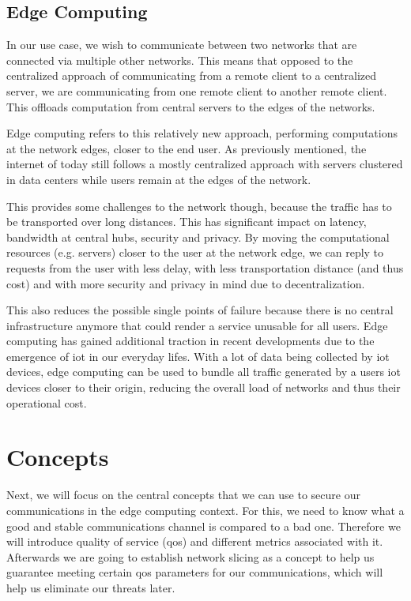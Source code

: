 \subsection{Edge Computing}
In our use case, we wish to communicate between two networks that are connected via multiple other networks. This means that opposed to the centralized approach of communicating from a remote client to a centralized server, we are communicating from one remote client to another remote client. This offloads computation from central servers to the edges of the networks.

Edge computing \cite{edgecomputing} refers to this relatively new approach, performing computations at the network edges, closer to the end user. As previously mentioned, the internet of today still follows a mostly centralized approach with servers clustered in data centers while users remain at the edges of the network.

This provides some challenges to the network though, because the traffic has to be transported over long distances. This has significant impact on \gls{latency}, \gls{bandwidth} at central hubs, security and privacy. By moving the computational resources (e.g. servers) closer to the user at the network edge, we can reply to requests from the user with less delay, with less transportation distance (and thus cost) and with more security and privacy in mind due to decentralization.

This also reduces the possible single points of failure because there is no central infrastructure anymore that could render a service unusable for all users. Edge computing has gained additional traction in recent developments due to the emergence of \acrshort{iot} in our everyday lifes. With a lot of data being collected by \acrshort{iot} devices, edge computing can be used to bundle all traffic generated by a users \acrshort{iot} devices closer to their origin, reducing the overall load of networks and thus their operational cost.


\section{Concepts}
\label{bg_concepts}
Next, we will focus on the central concepts that we can use to secure our communications in the edge computing context. For this, we need to know what a good and stable communications channel is compared to a bad one. Therefore we will introduce quality of service (\acrshort{qos}) and different metrics associated with it. Afterwards we are going to establish network slicing as a concept to help us guarantee meeting certain \acrshort{qos} parameters for our communications, which will help us eliminate our threats later.

